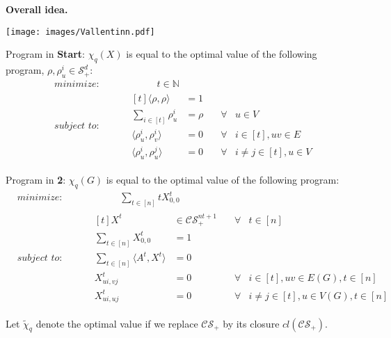 \documentclass[13.5pt]{beamer}
\begin{document}
\begin{frame}
\begin{block}{\color{colorblue}\textbf{Overall idea.}}
\end{block}
\texttt{[image: images/Vallentinn.pdf]}
\end{frame}

\begin{frame}
Program in \textbf{Start}: $\chi_q(X)$ is equal to the optimal value of the following program, $\rho, \rho_u^i \in \mathcal{S}_+^d$:
	\begin{equation*} 
	\begin{alignedat}{2}
	& \textit{minimize: } & &  \qquad \quad t \in \mathbb{N} \\
	& \textit{subject to: }& \quad   &\begin{aligned}[t] \langle \rho, \rho \rangle &  = 1  &  &  \\
	\sum\limits_{i\in [t]} \rho_{u}^i  & = \rho & \quad \forall &u \in V \\
	\langle \rho_{u}^i, \rho_{v}^i \rangle   & =0 & \quad \forall & i \in [t], uv \in E \\ 
	\langle \rho_{u}^i, \rho_{u}^j \rangle   & =0 & \quad \forall & i \neq j \in [t], u \in V
	\end{aligned}
	\end{alignedat}
	\end{equation*}

\end{frame}

\begin{frame}
Program in \textbf{2}: $\chi_q(G)$ is equal to the optimal value of the following program:
\begin{equation*} 
		\begin{alignedat}{2}
		& \textit{minimize: } & &  \qquad \quad \sum_{t\in [n]} tX_{0,0}^t \\
		& \textit{subject to: }& \quad   &\begin{aligned}[t] X^t &  \in \mathcal{CS}_+^{nt+1}  &  \quad \forall & t \in [n]  \\
		\sum_{t\in [n]} X_{0,0}^t  & = 1 &  &\\
		\sum_{t \in [n]} \langle A^t,X^t \rangle   & =0 & &  \\ 
		X_{ui,vj}^t   & =0 & \quad \forall & i \in [t], uv \in E(G), t\in [n] \\
		X_{ui,uj}^t   &= 0 & \quad \forall & i \neq j \in[t], u \in V(G), t\in[n]
		\end{aligned}
		\end{alignedat}
		\end{equation*}
       
       	Let $\tilde{\chi}_q$ denote the optimal value if we replace $\mathcal{CS}_+$ by its closure $cl(\mathcal{CS}_+)$.
\end{frame}
\end{document}
